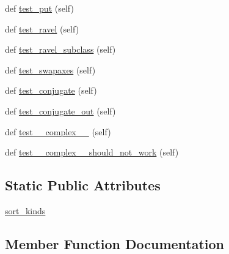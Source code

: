 \begin{DoxyCompactItemize}
\item 
def \hyperlink{classnumpy_1_1core_1_1tests_1_1test__multiarray_1_1TestMethods_a932aadba90629ea1a056fb11171c74ff}{test\+\_\+put} (self)
\item 
def \hyperlink{classnumpy_1_1core_1_1tests_1_1test__multiarray_1_1TestMethods_af3d269dce3ed5cea0a3ea1ded38cd62c}{test\+\_\+ravel} (self)
\item 
def \hyperlink{classnumpy_1_1core_1_1tests_1_1test__multiarray_1_1TestMethods_a4e0aa22e76b6ccccc14e83b9d98619f4}{test\+\_\+ravel\+\_\+subclass} (self)
\item 
def \hyperlink{classnumpy_1_1core_1_1tests_1_1test__multiarray_1_1TestMethods_a06a8bcc3ad75a7c4f4c202e583416f17}{test\+\_\+swapaxes} (self)
\item 
def \hyperlink{classnumpy_1_1core_1_1tests_1_1test__multiarray_1_1TestMethods_a41ea70caa45ef7fceb14a01074bdb72e}{test\+\_\+conjugate} (self)
\item 
def \hyperlink{classnumpy_1_1core_1_1tests_1_1test__multiarray_1_1TestMethods_aedd96f3d3521e400cb269fac1fa91612}{test\+\_\+conjugate\+\_\+out} (self)
\item 
def \hyperlink{classnumpy_1_1core_1_1tests_1_1test__multiarray_1_1TestMethods_abe487314cee745d693643107bed56448}{test\+\_\+\+\_\+complex\+\_\+\+\_\+} (self)
\item 
def \hyperlink{classnumpy_1_1core_1_1tests_1_1test__multiarray_1_1TestMethods_ada4f21b891346a222b967f1bb46b9f45}{test\+\_\+\+\_\+complex\+\_\+\+\_\+should\+\_\+not\+\_\+work} (self)
\end{DoxyCompactItemize}
\subsection*{Static Public Attributes}
\begin{DoxyCompactItemize}
\item 
\hyperlink{classnumpy_1_1core_1_1tests_1_1test__multiarray_1_1TestMethods_ab03ed8c87928996ba5dd03492caa57f6}{sort\+\_\+kinds}
\end{DoxyCompactItemize}


\subsection{Member Function Documentation}
\mbox{\label{classnumpy_1_1core_1_1tests_1_1test__multiarray_1_1TestMethods_a59a49416d54d2ddc92a494b406583afb}} 
